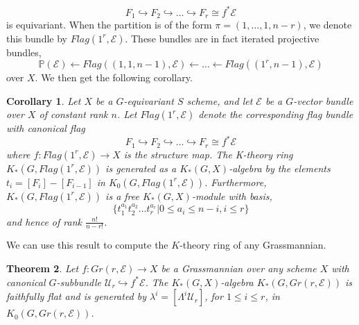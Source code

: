 \documentclass[11pt,twoside]{amsart}
\newtheorem{theorem}{Theorem}[section]
\newtheorem{corollary}[theorem]{Corollary}
\theoremstyle{definition}
\theoremstyle{remark}
\numberwithin{equation}{section}
\newcommand{\mc}{\mathcal}
\newcommand{\into}{\hookrightarrow}
\begin{document}
	\[ F_1\into F_2\into\ldots\into F_r\cong f^*\mathcal{E} \]
	is equivariant. When the partition is of the form $\pi=(1,\ldots,1,n-r)$, we denote this bundle by $Flag(1^r,\mathcal{E})$. These bundles are in fact iterated projective bundles, 
	\[\mathbb{P}(\mathcal{E})\leftarrow Flag((1,1,n-1),\mathcal{E})\leftarrow \ldots \leftarrow Flag((1^r,n-1),\mathcal{E}) \]
	over $X$. We then get the following corollary.
	\begin{corollary}\label{cor:K_completeflag}
		Let $X$ be a $G$-equivariant $S$ scheme, and let $\mc{E}$ be a $G$-vector bundle over $X$ of constant rank $n$. Let $Flag(1^r,\mathcal{E})$ denote the corresponding flag bundle with canonical flag
		\[ F_1\into F_2\into\ldots\into F_r\cong f^*\mathcal{E} \]
		where $f:Flag(1^r,\mathcal{E})\to X$ is the structure map. The K-theory ring $K_*(G, Flag(1^r,\mathcal{E}))$ is generated as a $K_*(G, X)$-algebra by the elements $t_i=[F_{i}]-[F_{i-1}]$ in $K_0(G, Flag(1^r,\mathcal{E}))$. Furthermore, $K_*(G, Flag(1^r,\mathcal{E}))$ is a free $K_*(G, X)$-module with basis,
		\[\{t_1^{a_1}t_2^{a_2}\ldots t_r^{a_r} |0\leq a_i\leq n-i, i\leq r  \} \]
		and hence of rank $\frac{n!}{n-r!}$. 	
		\end{corollary} 
		We can use this result to compute the $K$-theory ring of any Grassmannian. 
	\begin{theorem}\label{thm:K_Gr}
		Let $f:Gr(r,\mathcal{E})\to X$ be a Grassmannian over any scheme $X$ with canonical $G$-subbundle $\mathcal{U}_r\into f^*\mathcal{E}$. The $K_*(G,X)$-algebra  $K_*(G,Gr(r,\mathcal{E}))$ is faithfully flat and is generated by $\lambda^i=[\Lambda^i\mathcal{U}_r]$, for $1\leq i\leq r$, in $K_0(G,Gr(r,\mathcal{E}))$. 
		\end{theorem}
\end{document}
